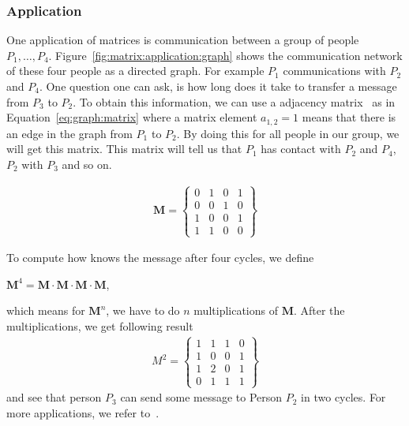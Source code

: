 \subsubsection{Application}
One application of matrices is communication between a group of people $P_1,\ldots,P_4$. Figure~\ref{fig:matrix:application:graph} shows the communication network of these four people as a directed graph. For example $P_1$ communications with $P_2$ and $P_4$. One question one can ask, is how long does it take to transfer a message from $P_3$ to $P_2$. To obtain this information, we can use a adjacency matrix~\cite{biggs1993algebraic} as in Equation~\eqref{eq:graph:matrix} where a matrix element $a_{1,2}=1$ means that there is an edge in the graph from $P_1$ to $P_2$. By doing this for all people in our group, we will get this matrix. This matrix will tell us that $P_1$ has contact with $P_2$ and $P_4$, $P_2$ with $P_3$ and so on.

\begin{align}
\mathbf{M} = \left\lbrace\begin{matrix}
0 & 1 & 0 & 1 \\
0 & 0 & 1 & 0 \\
1 & 0 & 0 & 1 \\
1 & 1 & 0 & 0
\end{matrix} \right\rbrace
\label{eq:graph:matrix}
\end{align}

To compute how knows the message after four cycles, we define
\begin{center}
$\mathbf{M}^4 = \mathbf{M} \cdot \mathbf{M} \cdot \mathbf{M} \cdot \mathbf{M} $,  
\end{center}
which means for $\mathbf{M}^n$, we have to do $n$ multiplications of $\mathbf{M}$. After the multiplications, we get following result
\begin{align*}
M^2 = \left\lbrace\begin{matrix}
1 &  1 & 1 &  0 \\
1 & 0 & 0  & 1 \\
1 & 2 & 0 & 1 \\
0 & 1 & 1 & 1
\end{matrix} \right\rbrace
\end{align*}
and see that person $P_3$ can send some message to Person $P_2$ in two cycles. For more applications, we refer to~\cite{scheick1997linear}. 

